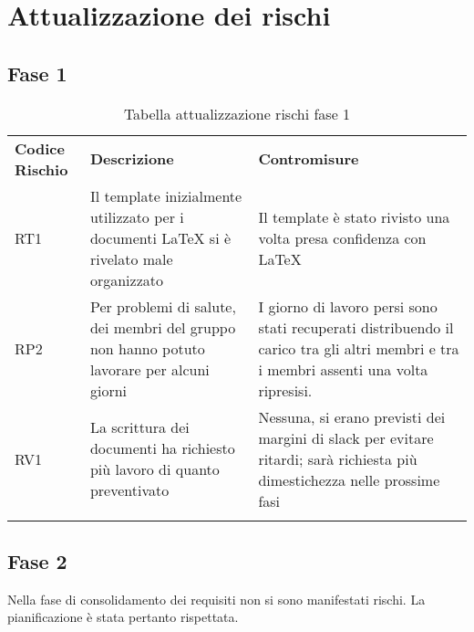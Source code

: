 \section{Attualizzazione dei rischi}
\label{sec:attualizzazione_rischi}
\subsection{Fase 1}
\label{sec:fase_1}
\begin{center}

\renewcommand{\arraystretch}{1.5}
	\begin{longtable}[H]{  	>{\Centering}p{2cm}	
							>{\RaggedRight}p{6cm}	
							>{\RaggedRight}p{6cm}  
							}
							
		\rowcolor{tableHeadYellow}
		\textbf{Codice Rischio}   & \textbf{Descrizione} & \textbf{Contromisure}\\ 

		RT1	&Il template inizialmente utilizzato per i documenti LaTeX si è rivelato male organizzato	&Il template è stato rivisto una volta presa confidenza con LaTeX\\
		RP2	&Per problemi di salute, dei membri del gruppo non hanno potuto lavorare per alcuni giorni	&I giorno di lavoro persi sono stati recuperati distribuendo il carico tra gli altri membri e tra i membri assenti una volta ripresisi.\\
		RV1	&La scrittura dei documenti ha richiesto più lavoro di quanto preventivato	&Nessuna, si erano previsti dei margini di slack per evitare ritardi; sarà richiesta più dimestichezza nelle prossime fasi\\

		\rowcolor{white}
		\caption{Tabella attualizzazione rischi fase 1}
	\end{longtable}
\end{center}

\subsection{Fase 2}
\label{sec:fase_2}
\begin{center}
Nella fase di consolidamento dei requisiti non si sono manifestati rischi.  \newline
La pianificazione è stata pertanto rispettata.
\end{center}

